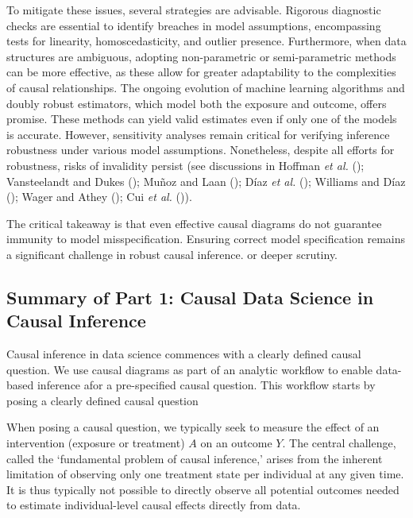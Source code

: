 \documentclass[
  singlecolumn,
  9pt]{article}
\begin{document}
To mitigate these issues, several strategies are advisable. Rigorous
diagnostic checks are essential to identify breaches in model
assumptions, encompassing tests for linearity, homoscedasticity, and
outlier presence. Furthermore, when data structures are ambiguous,
adopting non-parametric or semi-parametric methods can be more
effective, as these allow for greater adaptability to the complexities
of causal relationships. The ongoing evolution of machine learning
algorithms and doubly robust estimators, which model both the exposure
and outcome, offers promise. These methods can yield valid estimates
even if only one of the models is accurate. However, sensitivity
analyses remain critical for verifying inference robustness under
various model assumptions. Nonetheless, despite all efforts for
robustness, risks of invalidity persist (see discussions in Hoffman
\emph{et al.} (); Vansteelandt and Dukes
(); Muñoz and Laan
(); Díaz \emph{et al.}
(); Williams and Díaz
(); Wager and Athey
(); Cui \emph{et al.}
()).

The critical takeaway is that even effective causal diagrams do not
guarantee immunity to model misspecification. Ensuring correct model
specification remains a significant challenge in robust causal
inference. or deeper scrutiny.

\subsection{Summary of Part 1: Causal Data Science in Causal
Inference}\label{summary-of-part-1-causal-data-science-in-causal-inference}

Causal inference in data science commences with a clearly defined causal
question. We use causal diagrams as part of an analytic workflow to
enable data-based inference afor a pre-specified causal question. This
workflow starts by posing a clearly defined causal question

When posing a causal question, we typically seek to measure the effect
of an intervention (exposure or treatment) \(A\) on an outcome \(Y\).
The central challenge, called the `fundamental problem of causal
inference,' arises from the inherent limitation of observing only one
treatment state per individual at any given time. It is thus typically
not possible to directly observe all potential outcomes needed to
estimate individual-level causal effects directly from data.
\end{document}
